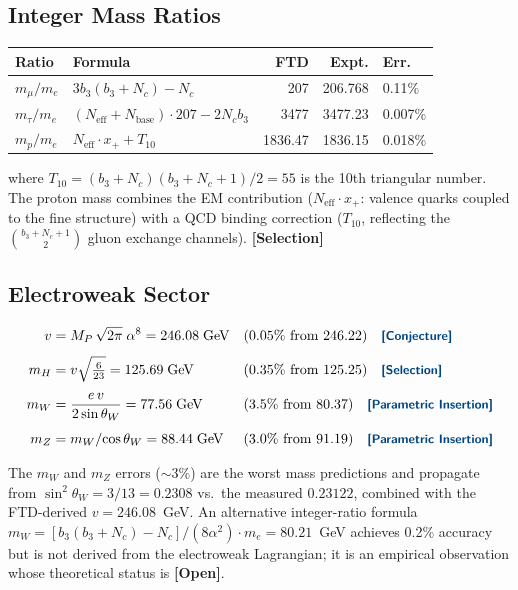 \documentclass[12pt]{article}
\theoremstyle{definition}
\theoremstyle{remark}
\newcommand{\epi}[1]{\textnormal{{\small\sffamily\bfseries\color{ftdblue}[#1]}}}
\begin{document}
\subsection{Integer Mass Ratios}

\begin{center}\small
\begin{tabular}{@{}llrrl@{}}
\toprule
\textbf{Ratio} & \textbf{Formula} & \textbf{FTD} & \textbf{Expt.} & \textbf{Err.} \\
\midrule
$m_\mu/m_e$ & $3b_3(b_3+N_c)-N_c$ & 207 & 206.768 & 0.11\% \\
$m_\tau/m_e$ & $(N_\text{eff}+N_\text{base})\cdot 207 - 2N_c b_3$ & 3477 & 3477.23 & 0.007\% \\
$m_p/m_e$ & $N_\text{eff}\cdot x_+ + T_{10}$ & 1836.47 & 1836.15 & 0.018\% \\
\bottomrule
\end{tabular}
\end{center}

\noindent where $T_{10} = (b_3 + N_c)(b_3 + N_c + 1)/2 = 55$ is the 10th triangular number.
The proton mass combines the EM contribution ($N_\text{eff}\cdot x_+$: valence quarks
coupled to the fine structure) with a QCD binding correction ($T_{10}$,
reflecting the $\binom{b_3 + N_c + 1}{2}$ gluon exchange channels). \epi{Selection}

\subsection{Electroweak Sector}

\begin{align}
v &= M_P\,\sqrt{2\pi}\;\alpha^8 = 246.08\;\text{GeV}
    & &\text{(0.05\% from 246.22)} \quad\epi{Conjecture} \label{eq:vev}\\[4pt]
m_H &= v\sqrt{\tfrac{6}{23}} = 125.69\;\text{GeV}
    & &\text{(0.35\% from 125.25)} \quad\epi{Selection} \label{eq:mh}\\[4pt]
m_W &= \frac{e\,v}{2\sin\theta_W} = 77.56\;\text{GeV}
    & &\text{(3.5\% from 80.37)} \quad\epi{Parametric Insertion} \label{eq:mw}\\[4pt]
m_Z &= m_W/\!\cos\theta_W = 88.44\;\text{GeV}
    & &\text{(3.0\% from 91.19)} \quad\epi{Parametric Insertion} \label{eq:mz}
\end{align}

\noindent The $m_W$ and $m_Z$ errors ($\sim 3\%$) are the worst mass predictions and propagate from
$\sin^2\!\theta_W = 3/13 = 0.2308$ vs.\ the measured $0.23122$, combined with the FTD-derived $v = 246.08$~GeV.
An alternative integer-ratio formula $m_W = [b_3(b_3+N_c)-N_c]/(8\alpha^2)\cdot m_e = 80.21$~GeV
achieves 0.2\% accuracy but is not derived from the electroweak Lagrangian; it is an empirical observation
whose theoretical status is \epi{Open}.
\end{document}
